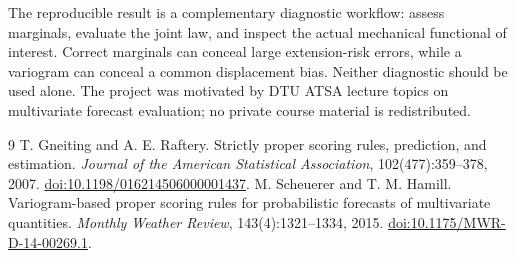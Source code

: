 \documentclass[10pt,a4paper]{article}
\begin{document}
The reproducible result is a complementary diagnostic workflow: assess marginals,
evaluate the joint law, and inspect the actual mechanical functional of interest.
Correct marginals can conceal large extension-risk errors, while a variogram
can conceal a common displacement bias. Neither diagnostic should be used alone.
The project was motivated by DTU ATSA lecture topics on multivariate forecast
evaluation; no private course material is redistributed.

\begin{thebibliography}{9}
 T. Gneiting and A. E. Raftery.
Strictly proper scoring rules, prediction, and estimation.
\emph{Journal of the American Statistical Association}, 102(477):359--378, 2007.
\href{https://doi.org/10.1198/016214506000001437}{doi:10.1198/016214506000001437}.
 M. Scheuerer and T. M. Hamill.
Variogram-based proper scoring rules for probabilistic forecasts of multivariate quantities.
\emph{Monthly Weather Review}, 143(4):1321--1334, 2015.
\href{https://doi.org/10.1175/MWR-D-14-00269.1}{doi:10.1175/MWR-D-14-00269.1}.
\end{thebibliography}
\end{document}
